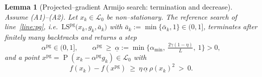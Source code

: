 \documentclass[12pt]{article}
\newtheorem{lemma}{Lemma}
\DeclareMathOperator{\proj}{P}
\begin{document}
\begin{lemma}[Projected--gradient Armijo search: termination and decrease]
\label{lem:pg}
Assume (A1)--(A2). Let $x_k\in\mathcal L_0$ be non--stationary. The reference
search of line~\ref{line:pg}, i.e.\
$\mathrm{LS}^{\mathrm{pg}}\big(x_k,g_k,\bar a_k\big)$ with
$\bar a_k:=\min\{\bar\alpha_k,1\}\in(0,1]$, terminates after finitely many
backtracks and returns a step
\begin{equation}\label{eq:steplb}
\alpha^{\mathrm{pg}}\in(0,1],\qquad
\alpha^{\mathrm{pg}}\ \ge\ \underline\alpha:=
\min\Big\{\alpha_{\min},\ \tfrac{2\gamma(1-\eta)}{L},\ 1\Big\}>0,
\end{equation}
and a point $x^{\mathrm{pg}}=\proj(x_k-\alpha^{\mathrm{pg}}g_k)\in\mathcal L_0$
with
\begin{equation}\label{eq:pg-dec}
f(x_k)-f(x^{\mathrm{pg}})\ \ge\ \eta\,\underline\alpha\,\rho(x_k)^2\ >\ 0 .
\end{equation}
\end{lemma}
\end{document}
